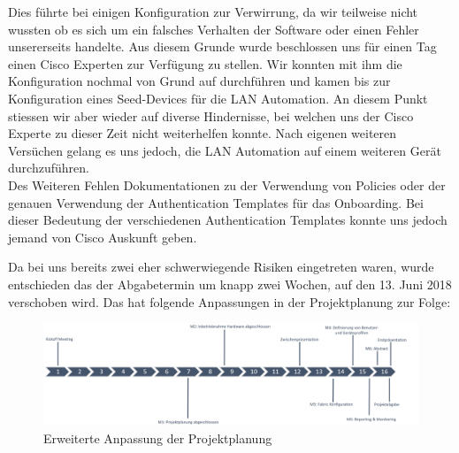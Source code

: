 Dies führte bei einigen Konfiguration zur Verwirrung, da wir teilweise nicht wussten ob es sich um ein falsches Verhalten der Software oder einen Fehler unsererseits handelte. Aus diesem Grunde wurde beschlossen uns für einen Tag einen Cisco Experten zur Verfügung zu stellen. Wir konnten mit ihm die Konfiguration nochmal von Grund auf durchführen und kamen bis zur Konfiguration eines Seed-Devices für die LAN Automation. An diesem Punkt stiessen wir aber wieder auf diverse Hindernisse, bei welchen uns der Cisco Experte zu dieser Zeit nicht weiterhelfen konnte. Nach eigenen weiteren Versüchen gelang es uns jedoch, die LAN Automation auf einem weiteren Gerät durchzuführen.\\
Des Weiteren Fehlen Dokumentationen zu der Verwendung von Policies oder der genauen Verwendung der Authentication Templates für das Onboarding. Bei dieser Bedeutung der verschiedenen Authentication Templates konnte uns jedoch jemand von Cisco Auskunft geben. 

Da bei uns bereits zwei eher schwerwiegende Risiken eingetreten waren, wurde entschieden das der Abgabetermin um knapp zwei Wochen, auf den 13. Juni 2018 verschoben wird. Das hat folgende Anpassungen in der Projektplanung zur Folge:


\begin{figure}[H]
	\centering
	\includegraphics[width=16cm]{img/ZeitlichePlanung_v4.png}
	\caption{Erweiterte Anpassung der Projektplanung}
	\label{fig:Erweiterte Anpassungen der Projektplanung}
\end{figure} 



